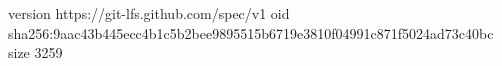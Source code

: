 version https://git-lfs.github.com/spec/v1
oid sha256:9aac43b445ecc4b1c5b2bee9895515b6719e3810f04991c871f5024ad73c40bc
size 3259
